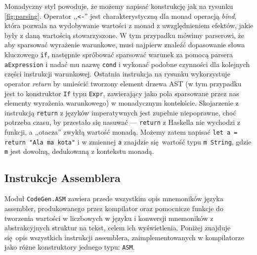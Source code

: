Monadyczny styl powoduje, że możemy napisać konstrukcję jak na rysunku \ref{fig:parsing}. Operator ,,\texttt{<-}'' jest charakterystyczną dla monad operacją \textit{bind}, która pozwala na wydobywanie wartości z monad z uwzględnieniem efektów, jakie były z daną wartością stowarzyszone. W tym przypadku mówimy parserowi, że aby sparsować wyrażenie warunkowe, musi najpierw znaleźć dopasowanie słowa kluczowego \texttt{if}, następnie spróbować sparsować warunek za pomocą parsera \texttt{aExpression} i nadać mu nazwę \texttt{cond} i wykonać podobne czynności dla kolejnych części instrukcji warunkowej. Ostatnia instrukcja na rysunku wykorzystuje operator \textit{return} by umieścić tworzony element drzewa AST (w tym przypadku jest to konstruktor \texttt{If} typu \texttt{Expr}, zawierający jako pola sparsowane przez nas elementy wyrażenia warunkowego) w monadycznym kontekście. Skojarzenie z instrukcją \texttt{return} z języków imperatywnych jest zupełnie niepoprawne, choć potrzeba czasu, by przestało się nasuwać --- \texttt{return} z Haskella nie wychodzi z funkcji, a ,,otacza'' zwykłą wartość monadą. Możemy zatem napisać \texttt{let a = return "Ala ma kota"} i w zmiennej \texttt{a} znajdzie się wartość typu \texttt{m String}, gdzie \texttt{m} jest dowolną, dedukowaną z kontekstu monadą.


\subsection{Instrukcje Assemblera}

Moduł \texttt{CodeGen.ASM} zawiera przede wszystkim opis mnemoników języka assembler, produkowanego przez kompilator oraz pomocnicze funkcje do tworzenia wartości w liczbowych w języku i konwersji mnemoników z abstrakcyjnych struktur na tekst, celem ich wyświetlenia. Poniżej znajduje się opis wszystkich instrukcji assemblera, zaimplementowanych w kompilatorze jako różne konstruktory jednego typu: \texttt{ASM}.


